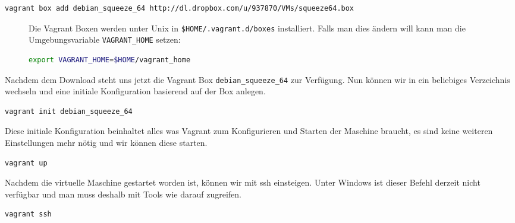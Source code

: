\documentclass[12pt,a4paper,ngerman]{article}
\begin{document}
\begin{lstlisting}[language=sh,caption=Download der Vagrant Box, label=vagrant-add]
vagrant box add debian_squeeze_64 http://dl.dropbox.com/u/937870/VMs/squeeze64.box
\end{lstlisting}

\begin{figure}
\vspace{-20pt}
\begin{boxedminipage}{4.5cm}
 Die Vagrant Boxen werden unter Unix in \lstinline!$HOME/.vagrant.d/boxes! installiert. 
Falls man dies ändern will kann man die Umgebungsvariable \lstinline$VAGRANT_HOME$ setzen:
\begin{lstlisting}[language=sh,label=vagrant-home,frame=none,numbers=none]
export VAGRANT_HOME=$HOME/vagrant_home
\end{lstlisting}
\end{boxedminipage}
\vspace{-20pt}
\end{figure}
 

Nachdem dem Download steht uns jetzt die  Vagrant Box \lstinline$debian_squeeze_64$ zur Verfügung. Nun können wir in ein beliebiges Verzeichnis wechseln und eine initiale Konfiguration basierend auf der Box anlegen.

\begin{lstlisting}[language=sh,caption=Vagrant initialisieren, label=vagrant-init]
vagrant init debian_squeeze_64
\end{lstlisting}

Diese initiale Konfiguration beinhaltet alles was Vagrant zum Konfigurieren und Starten der Maschine braucht, es sind keine weiteren Einstellungen mehr nötig und wir können diese starten.

\begin{lstlisting}[language=sh,caption=Starten der Vagrant Maschine, label=vagrant-up]
vagrant up
\end{lstlisting}

Nachdem die virtuelle Maschine gestartet worden ist, können wir mit ssh einsteigen. Unter Windows ist dieser Befehl derzeit nicht verfügbar und man muss deshalb mit Tools wie \cite{putty} darauf zugreifen.
\begin{lstlisting}[language=sh,caption=Mit ssh in der Vagrant Maschine einsteigen, label=vagrant-ssh]
vagrant ssh
\end{lstlisting}
 
\end{document}
